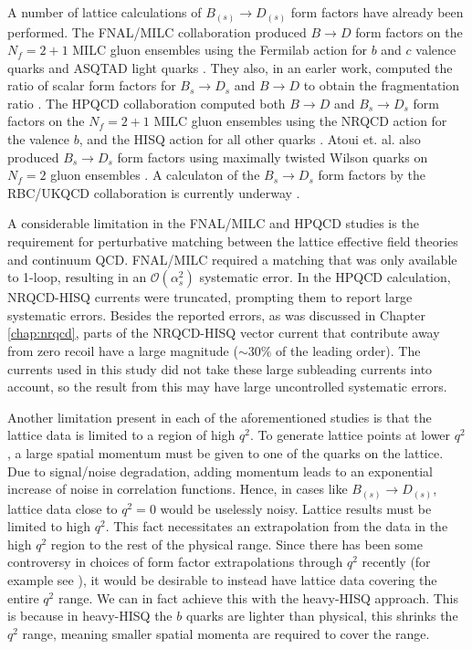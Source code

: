 A number of lattice calculations of $B_{(s)} \to D_{(s)}$ form factors have already been performed. The FNAL/MILC collaboration produced $B\to D$ form factors on the $N_f=2+1$ MILC gluon ensembles using the Fermilab action for $b$ and $c$ valence quarks and ASQTAD light quarks \cite{Lattice:2015rga}. They also, in an earler work, computed the ratio of scalar form factors for $B_s\to D_s$ and $B\to D$ to obtain the fragmentation ratio \cite{PhysRevD.85.114502}. The HPQCD collaboration computed both $B\to D$ and $B_s\to D_s$ form factors on the $N_f=2+1$ MILC gluon ensembles using the NRQCD action for the valence $b$, and the HISQ action for all other quarks \cite{Na:2015kha,Monahan:2017uby}. Atoui et. al. also produced $B_s\to D_s$ form factors using maximally twisted Wilson quarks on $N_f=2$ gluon ensembles \cite{Atoui2014}. A calculaton of the $B_s\to D_s$ form factors by the RBC/UKQCD collaboration is currently underway \cite{RBCmichigan}.

A considerable limitation in the FNAL/MILC and HPQCD studies is the requirement for perturbative matching between the lattice effective field theories and continuum QCD. FNAL/MILC required a matching that was only available to 1-loop, resulting in an $\mathcal{O}(\alpha_s^2)$ systematic error. In the HPQCD calculation, NRQCD-HISQ currents were truncated, prompting them to report large systematic errors. Besides the reported errors, as was discussed in Chapter \ref{chap:nrqcd}, parts of the NRQCD-HISQ vector current that contribute away from zero recoil have a large magnitude ($\sim 30\%$ of the leading order). The currents used in this study did not take these large subleading currents into account, so the result from this may have large uncontrolled systematic errors.

Another limitation present in each of the aforementioned studies is that the lattice data is limited to a region of high $q^2$. To generate lattice points at lower $q^2$, a large spatial momentum must be given to one of the quarks on the lattice. Due to signal/noise degradation, adding momentum leads to an exponential increase of noise in correlation functions. Hence, in cases like $B_{(s)}\to D_{(s)}$, lattice data close to $q^2=0$ would be uselessly noisy. Lattice results must be limited to high $q^2$. This fact necessitates an extrapolation from the data in the high $q^2$ region to the rest of the physical range. Since there has been some controversy in choices of form factor extrapolations through $q^2$ recently (for example see \cite{Bigi:2017njr,Grinstein:2017nlq}), it would be desirable to instead have lattice data covering the entire $q^2$ range. We can in fact achieve this with the heavy-HISQ approach. This is because in heavy-HISQ the $b$ quarks are lighter than physical, this shrinks the $q^2$ range, meaning smaller spatial momenta are required to cover the range.


